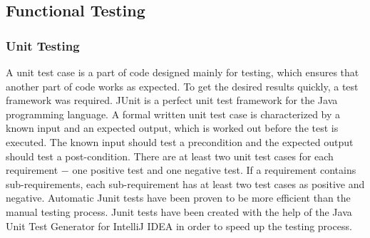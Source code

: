 \subsection{Functional Testing}

\subsubsection{Unit Testing}
A unit test case is a part of code designed mainly for testing, which ensures that another part of code works as expected.
To get the desired results quickly, a test framework was required. JUnit is a perfect unit test framework for the Java programming language.
A formal written unit test case is characterized by a known input and an expected output, which is worked out before the test is executed.
The known input should test a precondition and the expected output should test a post-condition.
There are at least two unit test cases for each requirement − one positive test and one negative test.
If a requirement contains sub-requirements, each sub-requirement has at least two test cases as positive and negative.
Automatic Junit tests have been proven to be more efficient than the manual testing process.
Junit tests have been created with the help of the Java Unit Test Generator for IntelliJ IDEA in order to speed up the testing process.

